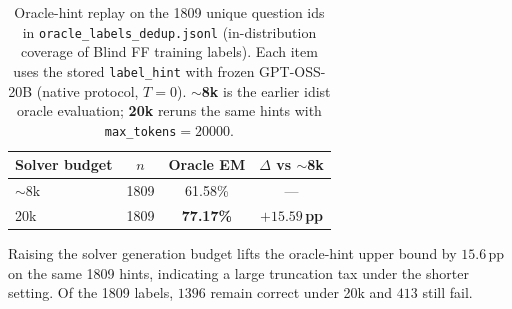 \begin{table}[t]
\centering
\small
\setlength{\tabcolsep}{6pt}
\caption{Oracle-hint replay on the 1809 unique question ids in
\texttt{oracle\_labels\_dedup.jsonl}
(in-distribution coverage of Blind FF training labels).
Each item uses the stored \texttt{label\_hint} with frozen GPT-OSS-20B
(native protocol, $T{=}0$).
\textbf{$\sim$8k} is the earlier idist oracle evaluation;
\textbf{20k} reruns the same hints with \texttt{max\_tokens}${}=20000$.}
\label{tab:oracle-hint-8k-vs-20k}
\begin{tabular}{lccc}
\toprule
\textbf{Solver budget}
  & \textbf{$n$}
  & \textbf{Oracle EM}
  & \textbf{$\Delta$ vs $\sim$8k} \\
\midrule
$\sim$8k
  & 1809
  & 61.58\%
  & --- \\
20k
  & 1809
  & \textbf{77.17\%}
  & \textcolor{green!60!black}{\textbf{$+15.59$\,pp}} \\
\bottomrule
\end{tabular}

\vspace{0.25em}
{\scriptsize
Raising the solver generation budget lifts the oracle-hint upper bound by
$15.6$\,pp on the same 1809 hints, indicating a large truncation tax under
the shorter setting.
Of the 1809 labels, $1396$ remain correct under 20k and $413$ still fail.
}
\end{table}
